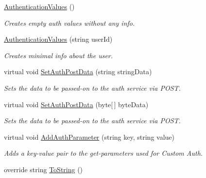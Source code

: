 \begin{DoxyCompactItemize}
\item 
\hyperlink{class_exit_games_1_1_client_1_1_photon_1_1_chat_1_1_authentication_values_aa1a218337b71411767e9d5ef7740bf02}{Authentication\+Values} ()
\begin{DoxyCompactList}\small\item\em Creates empty auth values without any info.\end{DoxyCompactList}\item 
\hyperlink{class_exit_games_1_1_client_1_1_photon_1_1_chat_1_1_authentication_values_a731ad99cd27c9c9943ebae6e7aade2e2}{Authentication\+Values} (string user\+Id)
\begin{DoxyCompactList}\small\item\em Creates minimal info about the user. \end{DoxyCompactList}\item 
virtual void \hyperlink{class_exit_games_1_1_client_1_1_photon_1_1_chat_1_1_authentication_values_a2b0231eb3737127f6c905fca3bda5976}{Set\+Auth\+Post\+Data} (string string\+Data)
\begin{DoxyCompactList}\small\item\em Sets the data to be passed-\/on to the auth service via P\+O\+ST. \end{DoxyCompactList}\item 
virtual void \hyperlink{class_exit_games_1_1_client_1_1_photon_1_1_chat_1_1_authentication_values_a551321f83ae6ae95688ebfa99251daf4}{Set\+Auth\+Post\+Data} (byte\mbox{[}$\,$\mbox{]} byte\+Data)
\begin{DoxyCompactList}\small\item\em Sets the data to be passed-\/on to the auth service via P\+O\+ST. \end{DoxyCompactList}\item 
virtual void \hyperlink{class_exit_games_1_1_client_1_1_photon_1_1_chat_1_1_authentication_values_ad82074fee0c1ef809978e612dd882405}{Add\+Auth\+Parameter} (string key, string value)
\begin{DoxyCompactList}\small\item\em Adds a key-\/value pair to the get-\/parameters used for Custom Auth. \end{DoxyCompactList}\item 
override string \hyperlink{class_exit_games_1_1_client_1_1_photon_1_1_chat_1_1_authentication_values_a083a5547fef3709586481254c256e04e}{To\+String} ()
\end{DoxyCompactItemize}
